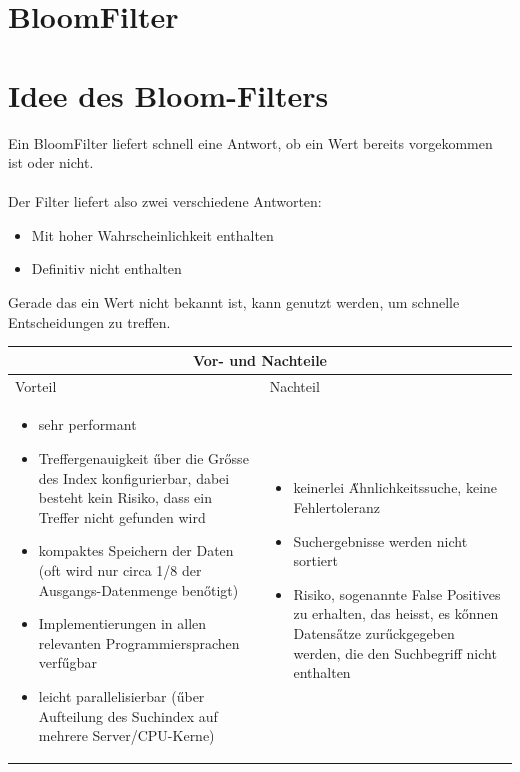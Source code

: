 \documentclass[11pt, a4paper]{article}
\begin{document}
\section*{BloomFilter}


\section{Idee des Bloom-Filters}
Ein BloomFilter liefert schnell eine Antwort, ob ein Wert bereits vorgekommen ist oder nicht. \\\\
Der Filter liefert also zwei verschiedene Antworten:
\begin{itemize}  
	\item Mit hoher Wahrscheinlichkeit enthalten
	\item Definitiv nicht enthalten
\end{itemize}
Gerade das ein Wert nicht bekannt ist, kann genutzt werden, um schnelle Entscheidungen zu treffen.\\





\begin{tabular}{ |p{8cm}||p{8cm}|  }
	\hline
	\multicolumn{2}{|c|}{Vor- und Nachteile} \\
	\hline
	Vorteil&Nachteil\\
	\hline
	\begin{itemize}  
		\item sehr performant
		\item Treffergenauigkeit {\H u}ber die Gr{\H o}sse des Index konfigurierbar, dabei besteht kein Risiko, dass ein Treffer nicht gefunden wird 
		\item kompaktes Speichern der Daten (oft wird nur circa 1/8 der Ausgangs-Datenmenge ben{\H o}tigt) 
		\item Implementierungen in allen relevanten Programmiersprachen verf{\H u}gbar 
		\item leicht parallelisierbar ({\H u}ber Aufteilung des Suchindex auf mehrere Server/CPU-Kerne) 
	\end{itemize}
	&
	\begin{itemize}  
		\item keinerlei {\H A}hnlichkeitssuche, keine Fehlertoleranz 
		\item Suchergebnisse werden nicht sortiert 
		\item Risiko, sogenannte False Positives zu erhalten, das heisst, es k{\H o}nnen Datens{\H a}tze zur{\H u}ckgegeben werden, die den Suchbegriff nicht enthalten 
	\end{itemize}
	\\
	\hline
\end{tabular}
\end{document}
